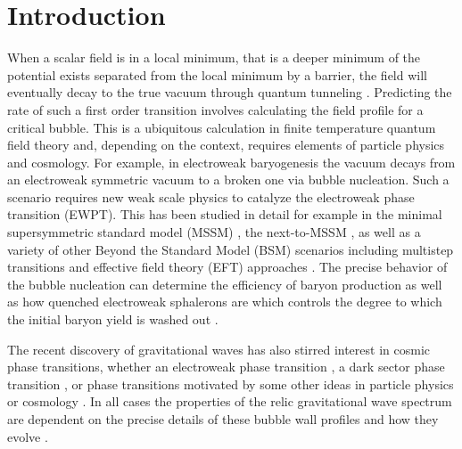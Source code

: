 \documentclass[final,3p,11pt,pdflatex]{elsarticle}
\begin{document}
\section{Introduction}
\label{sec:intro}
When a scalar field is in a local minimum, that is a deeper minimum of the potential exists separated from the local minimum by a barrier, the field will
eventually decay to the true vacuum through quantum tunneling
\cite{Coleman:1977py,Callan:1977pt,Linde:1980tt}.  Predicting the rate of such
a first order transition involves calculating the field profile for a critical
bubble.  This is a ubiquitous calculation in finite temperature quantum field
theory and, depending on the context, requires elements of particle physics and cosmology.  For
example, in electroweak baryogenesis \cite{Morrissey:2012db,White:2016nbo,
  Das:2000ft} the vacuum decays from an electroweak symmetric vacuum to a
broken one via bubble nucleation. Such a scenario requires new weak scale
physics to catalyze the electroweak phase transition (EWPT).  This has been
studied in detail for example in the minimal supersymmetric standard model
(MSSM) \cite{Lee:2004we,Balazs:2004ae,Carena:2008vj,Carena:2012np,
  Liebler:2015ddv,Huber:2001xf,Huber:2006ma}, the next-to-MSSM
\cite{Menon:2004wv,Balazs:2013cia,Akula:2017yfr,Davies:1996qn,Huber:2006wf,
  Kozaczuk:2014kva,Huber:2006ma,Bian:2017wfv}, as well as a variety of other
Beyond the Standard Model (BSM) scenarios including multistep transitions
\cite{Ramsey-Musolf:2017tgh,Inoue:2015pza,Patel:2013zla} and  effective field
theory (EFT) approaches \cite{Balazs:2016yvi,deVries:2017ncy,Grojean:2004xa,Kobakhidze:2015xlz,Huang:2015izx}.
The precise behavior of the bubble nucleation can determine the efficiency of
baryon production \cite{Balazs:2016yvi} as well as how quenched electroweak
sphalerons are which controls the degree to which the initial baryon yield is
washed out \cite{Patel:2011th}.


The recent discovery of gravitational waves \cite{Abbott:2016blz} has
also stirred interest in cosmic phase transitions, whether an
electroweak phase transition
\cite{Croon:2018new,Hashino:2018zsi,Chala:2018ari,Chen:2017cyc,
  Kang:2017mkl,Iso:2017uuu,Kobakhidze:2017mru,Beniwal:2017eik,Chao:2017vrq,Huang:2016odd,Huang:2017rzf,Chala:2018opy,Angelescu:2018dkk},
a dark sector phase transition \cite{Schwaller:2015tja,Shelton:2010ta,
  Chowdhury:2011ga,Croon:2018erz}, or phase transitions motivated by some other
ideas in particle physics or cosmology
\cite{Huber:2007vva,Balazs:2016tbi,
  Kamionkowski:1993fg,Apreda:2001us,Caprini:2007xq,Hindmarsh:2013xza,
  Caprini:2009fx,Espinosa:2010hh,Binetruy:2012ze,Huang:2017laj,Wan:2018udw,Mazumdar:2018dfl,Croon:2018kqn}.
In all cases the properties of the relic gravitational wave spectrum
are dependent on the precise details of these bubble wall profiles and
how they evolve
\cite{Huber:2008hg,Hindmarsh:2017gnf,Jinno:2017fby,Hindmarsh:2016lnk,
  Konstandin:2017sat,Weir:2017wfa}.
\end{document}
